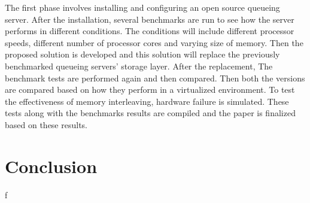 \documentclass[12pt,a4paper]{article}
\begin{document}
 \bigskip
The first phase involves installing and configuring an open source queueing server. After the installation, several benchmarks are run to see how the server performs in different conditions. The conditions will include different processor speeds, different number of processor cores and varying size of memory. Then the proposed solution is developed and this solution will replace the previously benchmarked queueing servers' storage layer. After the replacement, The benchmark tests are performed again and then compared. Then both the versions are compared based on how they perform in a virtualized environment. To test the effectiveness of memory interleaving, hardware failure is simulated. These tests along with the benchmarks results are  compiled and the paper is finalized based on these results.

\section{Conclusion}
f



\end{document}
